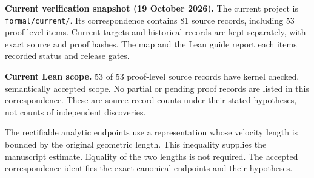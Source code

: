 \textbf{Current verification snapshot (19 October 2026).} The current project is \texttt{formal/current/}. Its correspondence contains 81 source records, including 53 proof-level items. Current targets and historical records are kept separately, with exact source and proof hashes. The map and the Lean guide report each item\textquotesingle s recorded status and release gates.

\textbf{Current Lean scope.} 53 of 53 proof-level source records have kernel checked, semantically accepted scope. No partial or pending proof records are listed in this correspondence. These are source-record counts under their stated hypotheses, not counts of independent discoveries.


The rectifiable analytic endpoints use a representation whose velocity length is bounded by the original geometric length. This inequality supplies the manuscript estimate. Equality of the two lengths is not required. The accepted correspondence identifies the exact canonical endpoints and their hypotheses.

